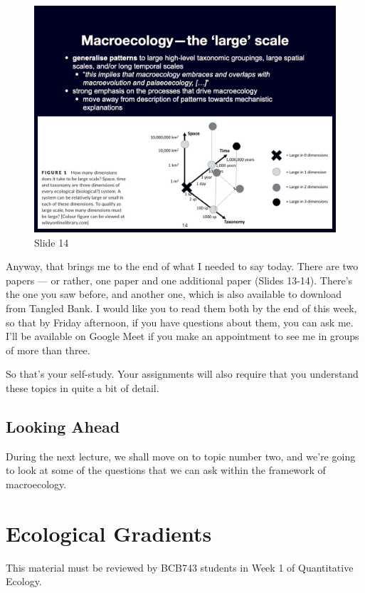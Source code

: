 \documentclass[
  10pt,
]{book}
\begin{document}
\begin{figure}[ht]
\centering
\includegraphics[width=0.8\linewidth]{../images/BDC334/BDC334-014.jpeg}
\caption*{Slide 14}
\end{figure}

Anyway, that brings me to the end of what I needed to say today. There
are two papers --- or rather, one paper and one additional paper (Slides
13-14). There's the one you saw before, and another one, which is also
available to download from Tangled Bank. I would like you to read them
both by the end of this week, so that by Friday afternoon, if you have
questions about them, you can ask me. I'll be available on Google Meet
if you make an appointment to see me in groups of more than three.

So that's your self-study. Your assignments will also require that you
understand these topics in quite a bit of detail.

\section{Looking Ahead}\label{looking-ahead}

During the next lecture, we shall move on to topic number two, and we're
going to look at some of the questions that we can ask within the
framework of macroecology.

\chapter{Ecological Gradients}\label{ecological-gradients}

\begin{tcolorbox}[enhanced jigsaw, leftrule=.75mm, arc=.35mm, title=\textcolor{quarto-callout-note-color}{\faInfo}\hspace{0.5em}{BCB743}, opacityback=0, colframe=quarto-callout-note-color-frame, toprule=.15mm, bottomtitle=1mm, opacitybacktitle=0.6, titlerule=0mm, colback=white, left=2mm, colbacktitle=quarto-callout-note-color!10!white, toptitle=1mm, rightrule=.15mm, breakable, coltitle=black, bottomrule=.15mm]

This material must be reviewed by BCB743 students in Week 1 of
Quantitative Ecology.

\end{tcolorbox}
\end{document}
